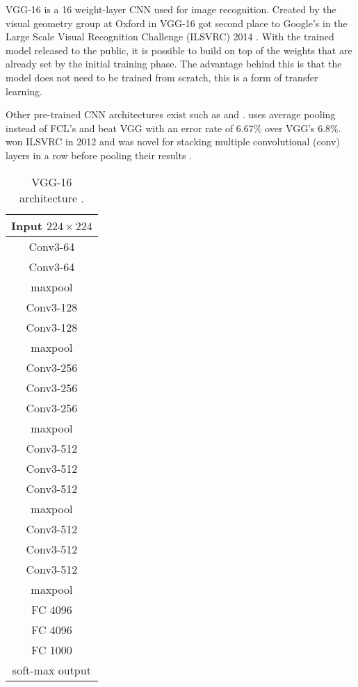 \newcommand{\isize}[1]{$#1 \times #1$}

VGG-16 is a 16 weight-layer CNN used for image recognition. Created by the visual geometry group at Oxford in \citeyear{vgg16-arxiv} VGG-16 got second place to Google's \gnet in the Large Scale Visual Recognition Challenge (ILSVRC) 2014 \cite{vgg16-arxiv}. With the trained model released to the public, it is possible to build on top of the weights that are already set by the initial training phase. The advantage behind this is that the model does not need to be trained from scratch, this is a form of transfer learning.

Other pre-trained CNN architectures exist such as \gnet and \anet. \gnet uses average pooling instead of FCL's \cite{googlenet-paper} and beat VGG with an error rate of 6.67\% over VGG's 6.8\%. \anet won ILSVRC in 2012 and was novel for stacking multiple convolutional (conv) layers in a row before pooling their results \cite{alexnet-paper}. %

\begin{wraptable}{r}{4cm}
    \centering
    \begin{tabular}{| c |}
        \hline
        Input $224 \times 224$ \\
        \hline
        Conv3-64 \\
        Conv3-64 \\
        \hline
        maxpool\\
        \hline
        Conv3-128 \\
        Conv3-128 \\
        \hline
        maxpool \\
        \hline
        Conv3-256 \\
        Conv3-256 \\
        Conv3-256 \\
        \hline
        maxpool \\
        \hline
        Conv3-512 \\
        Conv3-512 \\
        Conv3-512 \\
        \hline
        maxpool \\
        \hline
        Conv3-512 \\
        Conv3-512 \\
        Conv3-512 \\
        \hline
        maxpool\\
        \hline
        FC 4096\\
        \hline
        FC 4096\\
        \hline
        FC 1000\\
        \hline
        soft-max output\\
        \hline
    \end{tabular}
    \caption{VGG-16 architecture \cite{vgg16-arxiv}.}
    \label{vgg-table}
\end{wraptable}

